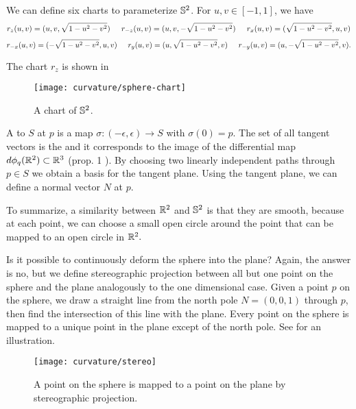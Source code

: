 \begin{example}\label{ex:sphere-charts}

We can define six charts to parameterize $\mathbb{S}^2$.
For $u,v\in[-1,1]$, we have
$$r_{z}(u,v)=(u,v,\sqrt{1-u^2-v^2}) \hspace{.5cm}  r_{-z}(u,v)=(u,v,-\sqrt{1-u^2-v^2}) \hspace{.5cm}  r_{x}(u,v)=(\sqrt{1-u^2-v^2},u,v) $$
$$r_{-x}(u,v)=(-\sqrt{1-u^2-v^2},u,v) \hspace{.5cm}  r_{y}(u,v)=(u,\sqrt{1-u^2-v^2},v) \hspace{.5cm}   r_{-y}(u,v)=(u,-\sqrt{1-u^2-v^2},v). $$

The chart $r_{z}$ is shown in 

\begin{figure}[htb]
	\centering
	\texttt{[image: curvature/sphere-chart]}
	\caption{A chart of $\mathbb{S}^2$.}
	\label{fig:sphere-chart}
\end{figure}


\end{example}


A  to $S$ at $p$ is a map $\sigma:(-\epsilon,\epsilon)\to S$ with $\sigma(0)=p$.
The set of all tangent vectors is the  and it corresponds to the image
of the differential map $d\phi_q(\mathbb{R}^2)\subset \mathbb{R}^3$ (prop. 1 \cite{doc76}).
By choosing two linearly independent paths through $p\in S$ we obtain a basis 
for the tangent
plane. Using the tangent plane, we can define a normal vector $N$ at $p$.

To summarize, a similarity between  $\mathbb{R}^2$ and $\mathbb{S}^2$ is that they are smooth, 
because at each point,
we can choose a small open circle around the point that can be mapped
to an open circle in $\mathbb{R}^2.$ 

Is it possible to continuously deform the sphere into the plane?
Again, the answer is no, but we define stereographic projection between all but one point
 on the sphere and the plane analogously to the one dimensional case.
 Given a point $p$ on the sphere, we draw a straight line
from the north pole $N=(0,0,1)$ through $p$, then find the intersection of
this line with the plane. Every point on the sphere is mapped
to a unique point in the plane except of the north pole.
See  for an illustration.





\begin{figure}[htb]
	\centering
	\texttt{[image: curvature/stereo]}
	\caption{A point on the sphere is mapped to a point on the plane by stereographic projection.}
	\label{fig:stereo1}
\end{figure}


